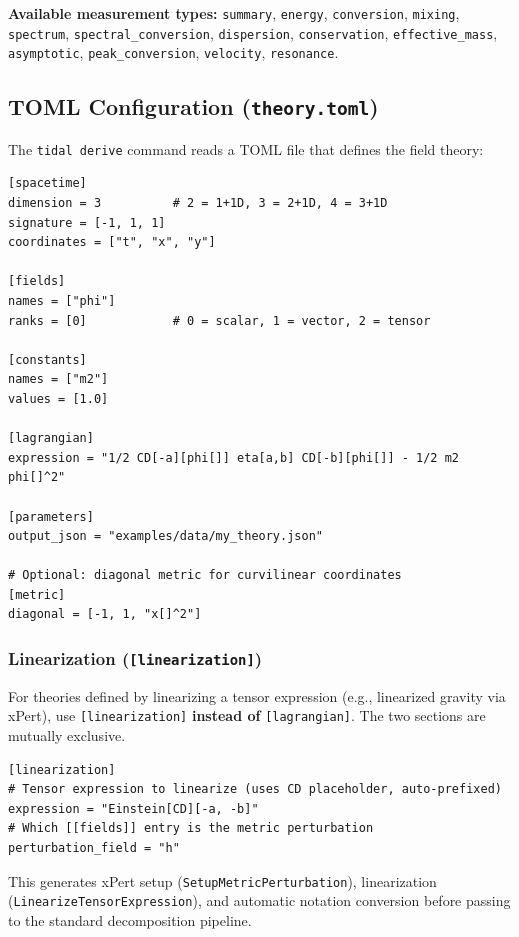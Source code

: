 \textbf{Available measurement types:} \texttt{summary}, \texttt{energy}, \texttt{conversion}, \texttt{mixing}, \texttt{spectrum}, \texttt{spectral\_conversion}, \texttt{dispersion}, \texttt{conservation}, \texttt{effective\_mass}, \texttt{asymptotic}, \texttt{peak\_conversion}, \texttt{velocity}, \texttt{resonance}.

\subsection{TOML Configuration (\texttt{theory.toml})}

The \texttt{tidal derive} command reads a TOML file that defines the field theory:

\begin{lstlisting}[style=toml]
[spacetime]
dimension = 3          # 2 = 1+1D, 3 = 2+1D, 4 = 3+1D
signature = [-1, 1, 1]
coordinates = ["t", "x", "y"]

[fields]
names = ["phi"]
ranks = [0]            # 0 = scalar, 1 = vector, 2 = tensor

[constants]
names = ["m2"]
values = [1.0]

[lagrangian]
expression = "1/2 CD[-a][phi[]] eta[a,b] CD[-b][phi[]] - 1/2 m2 phi[]^2"

[parameters]
output_json = "examples/data/my_theory.json"

# Optional: diagonal metric for curvilinear coordinates
[metric]
diagonal = [-1, 1, "x[]^2"]
\end{lstlisting}

\subsubsection{Linearization (\texttt{[linearization]})}

For theories defined by linearizing a tensor expression (e.g., linearized gravity via xPert), use \texttt{[linearization]} \textbf{instead of} \texttt{[lagrangian]}. The two sections are mutually exclusive.

\begin{lstlisting}[style=toml]
[linearization]
# Tensor expression to linearize (uses CD placeholder, auto-prefixed)
expression = "Einstein[CD][-a, -b]"
# Which [[fields]] entry is the metric perturbation
perturbation_field = "h"
\end{lstlisting}

This generates xPert setup (\texttt{SetupMetricPerturbation}), linearization (\texttt{LinearizeTensorExpression}), and automatic notation conversion before passing to the standard decomposition pipeline.

